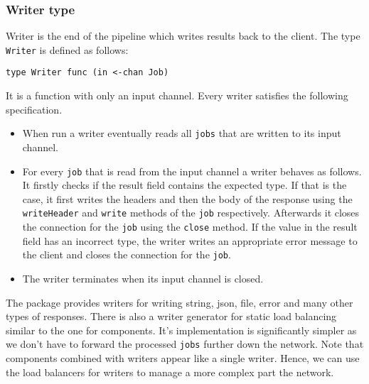 \subsubsection{Writer type}
Writer is the end of the pipeline which writes results back to the client.
The type \texttt{Writer} is defined as follows:
\begin{lstlisting}
type Writer func (in <-chan Job)
\end{lstlisting}
It is a function with only an input channel.
Every writer satisfies the following specification.
\begin{itemize}
    \item When run a writer eventually reads all \texttt{jobs} that are written 
          to its input channel.

	\item For every \texttt{job} that is  read from the input channel a writer 
          behaves as follows. It firstly checks if the result field 
          contains the expected type. If that is the case, it first 
          writes the headers and then the body of the response using 
          the \texttt{writeHeader} and \texttt{write} methods of the \texttt{job} respectively. Afterwards it closes the connection for the \texttt{job} 
          using the \texttt{close} method. If the value in the result 
          field has an incorrect type, the writer writes an appropriate 
          error message to the client and closes the connection for the 
          \texttt{job}. 

	\item The writer terminates when its input channel is closed.
\end{itemize}
The package provides writers for writing string, json, file, error and many
other types of responses. There is also a writer generator for static
load balancing similar to the one for components. It's implementation
is significantly simpler as we don't have to forward the processed
\texttt{jobs} further down the network. Note that components
combined with writers appear like a single writer. Hence, we can use the
load balancers for writers to manage a more complex part the network.

